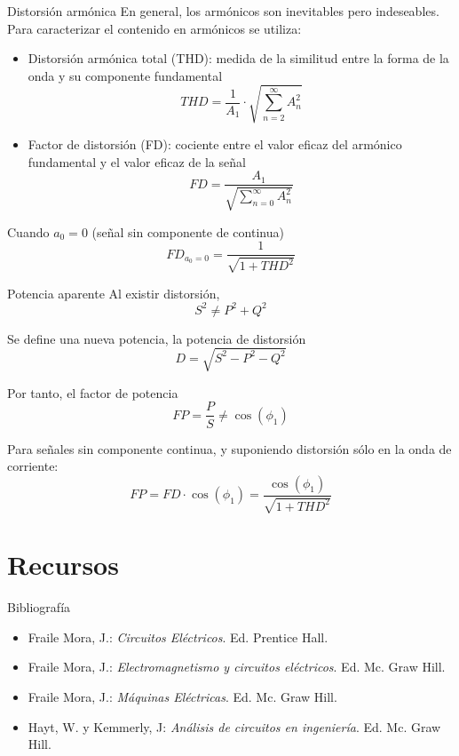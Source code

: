 \documentclass[xcolor={usenames,svgnames,dvipsnames}]{beamer}
\begin{document}
\begin{frame}[label={sec:org38cd57d}]{Distorsión armónica}
En general, los armónicos son inevitables pero indeseables. Para
caracterizar el contenido en armónicos se utiliza:

\begin{itemize}
\item \alert{Distorsión armónica total (THD)}: medida de la similitud entre la
forma de la onda y su componente fundamental
$$THD=\frac{1}{A_{1}}\cdot\sqrt{\sum_{n=2}^{\infty}A_{n}^{2}}$$

\item \alert{Factor de distorsión (FD)}: cociente entre el valor eficaz del
armónico fundamental y el valor eficaz de la señal
$$FD=\frac{A_{1}}{\sqrt{\sum_{n=0}^{\infty}A_{n}^{2}}}$$
\end{itemize}

Cuando \(a_{0}=0\) (señal sin componente de continua)
$$FD_{a_{0}=0}=\frac{1}{\sqrt{1+THD^{2}}}$$
\end{frame}

\begin{frame}[label={sec:org091861c}]{Potencia aparente}
Al existir distorsión, $$S^{2}\neq P^{2}+Q^{2}$$

Se define una nueva potencia, la potencia de distorsión
$$D=\sqrt{S^{2}-P^{2}-Q^{2}}$$

Por tanto, el factor de potencia $$FP=\frac{P}{S}\neq\cos(\phi_{1})$$

Para señales sin componente continua, y suponiendo distorsión sólo en la
onda de corriente:
$$FP=FD\cdot\cos(\phi_{1})=\frac{\cos(\phi_{1})}{\sqrt{1+THD^{2}}}$$
\end{frame}

\section{Recursos}
\label{sec:orgc8db4bf}
\begin{frame}[label={sec:orgb2fb06f}]{Bibliografía}
\begin{itemize}
\item \alert{Fraile Mora, J.}: \emph{Circuitos Eléctricos}. Ed. Prentice Hall.

\item \alert{Fraile Mora, J.}: \emph{Electromagnetismo y circuitos eléctricos}. Ed.
Mc. Graw Hill.

\item \alert{Fraile Mora, J.}: \emph{Máquinas Eléctricas}. Ed. Mc. Graw Hill.

\item \alert{Hayt, W. y Kemmerly, J}: \emph{Análisis de circuitos en ingeniería}. Ed.
Mc. Graw Hill.
\end{itemize}
\end{frame}
\end{document}
